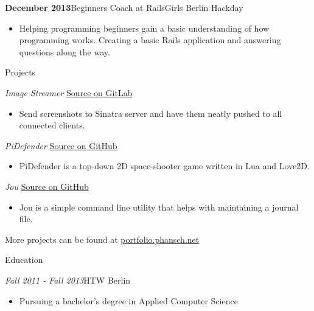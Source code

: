 \documentclass[12pt]{article}
\begin{document}
\textbf{December 2013}\hfill Beginners Coach at RailsGirls Berlin Hackday
\begin{itemize}
  \setlength{\itemsep}{0cm}
  \setlength{\parskip}{0cm}

  \item Helping programming beginners gain a basic understanding of how programming works. Creating a basic Rails application and answering questions along the way.
\end{itemize}

\vspace{0.5cm}
{\Large Projects}

\emph{Image Streamer} \hfill \href{https://gitlab.com/phansch/screenshot-streamer/tree/master}{Source on GitLab}
\begin{itemize}
  \setlength{\itemsep}{0cm}
  \setlength{\parskip}{0cm}

  \item[] Send screenshots to Sinatra server and have them neatly pushed to all connected clients.
\end{itemize}

\emph{PiDefender} \hfill \href{https://gitlab.com/phansch/pidefender/tree/master}{Source on GitHub}
\begin{itemize}
  \setlength{\itemsep}{0cm}
  \setlength{\parskip}{0cm}

  \item[] PiDefender is a top-down 2D space-shooter game written in Lua and Love2D.
\end{itemize}


\emph{Jou} \hfill \href{https://github.com/phansch/jou}{Source on GitHub}
\begin{itemize}
  \setlength{\itemsep}{0cm}
  \setlength{\parskip}{0cm}

  \item[] Jou is a simple command line utility that helps with maintaining a journal file.
\end{itemize}

More projects can be found at \href{http://phansch.net/}{portfolio.phansch.net}

\vspace{0.5cm}
{\Large Education}

\emph{Fall 2011 - Fall 2013}\hfill HTW Berlin
\begin{itemize}
  \setlength{\itemsep}{0cm}
  \setlength{\parskip}{0.1cm}
  \item[] Pursuing a bachelor's degree in Applied Computer Science
\end{itemize}
\end{document}
